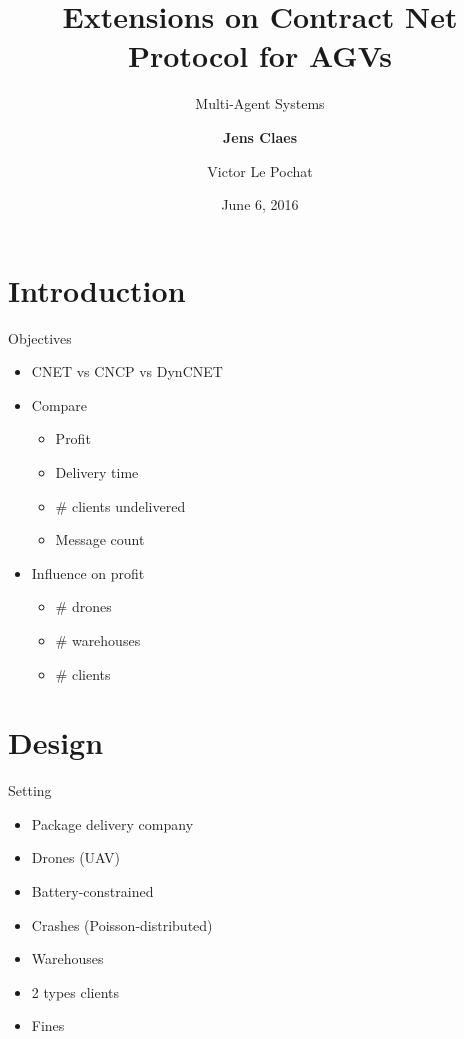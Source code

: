 \documentclass[notes]{beamer}
\title{Extensions on Contract Net Protocol for AGVs}
\subtitle{Multi-Agent Systems}
\author{\textbf{Jens Claes} \and Victor Le Pochat}
\date{June 6, 2016}
\begin{document}
	\frame{\titlepage}

	\section{Introduction}
	
	\begin{frame}{Objectives}
		\begin{itemize}
		\item CNET vs CNCP vs DynCNET
		\item Compare
			\begin{itemize}
			\item Profit
			\item Delivery time
			\item \# clients undelivered
			\item Message count
			\end{itemize}
		\item Influence on profit
			\begin{itemize}
			\item \# drones
			\item \# warehouses
			\item \# clients
			\end{itemize}
		\end{itemize}
	\end{frame}
		
	\section{Design}
	\begin{frame}{Setting}
		\begin{itemize}
		\item Package delivery company
		\item Drones (UAV)
		\item Battery-constrained
		\item Crashes (Poisson-distributed)
		\item Warehouses
		\item 2 types clients
		\item Fines
		\end{itemize}
	\end{frame}
	
	
\end{document}
